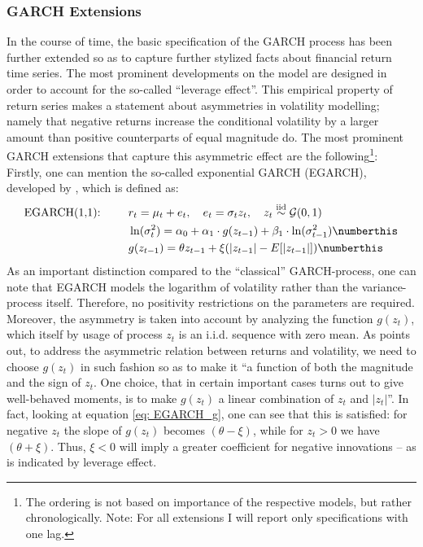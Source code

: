 \subsubsection{GARCH Extensions}
\label{sssec: lit_rev_vola_GARCH_ext}

In the course of time, the basic specification of the GARCH process has been further extended so as to capture further stylized facts about financial return time series. The most prominent developments on the model are designed in order to account for the so-called \enquote{leverage effect}. This empirical property of return series makes a statement about asymmetries in volatility modelling; namely that negative returns increase the conditional volatility by a larger amount than positive counterparts of equal magnitude do. The most prominent GARCH extensions that capture this asymmetric effect are the following\footnote{The ordering is not based on importance of the respective models, but rather chronologically. Note: For all extensions I will report only specifications with one lag.}: Firstly, one can mention the so-called exponential GARCH (EGARCH), developed by \textcite{Nelson1991}, which is defined as:
\begin{align*}
\text{EGARCH(1,1): }\qquad & r_t = \mu_{t} + e_{t}, \quad e_{t} = \sigma_{t} z_{t},\quad  z_{t} \overset{\text{iid}}{\sim} \mathcal{G}(0,1) \\
& \ln (\sigma_t^2) = \alpha_0 + \alpha_1 \cdot g(z_{t-1}) + \beta_1 \cdot \ln (\sigma_{t-1}^2) \numberthis \\
& g(z_{t-1}) = \theta z_{t-1} + \xi(|z_{t-1}| - E[|z_{t-1}|]) \numberthis \label{eq: EGARCH_g}
\end{align*} 
As an important distinction compared to the \enquote{classical} GARCH-process, one can note that EGARCH models the logarithm of volatility rather than the variance-process itself. Therefore, no positivity restrictions on the parameters are required. Moreover, the asymmetry is taken into account by analyzing the function $g(z_{t})$, which itself by usage of process $z_{t}$ is an i.i.d. sequence with zero mean. As  \textcite[351]{Nelson1991} points out, to address the asymmetric relation between returns and volatility, we need to choose $g(z_{t})$ in such fashion so as to make it \enquote{a function of both the magnitude and the sign of $z_{t}$. One choice, that in certain important cases turns out to give well-behaved moments, is to make $g(z_{t})$ a linear combination of $z_{t}$ and $|z_{t}|$}. In fact, looking at equation \eqref{eq: EGARCH_g}, one can see that this is satisfied: for negative $z_{t}$ the slope of $g(z_{t})$ becomes $(\theta-\xi)$, while for $z_{t}>0$ we have $(\theta+\xi)$. Thus, $\xi<0$ will imply a greater coefficient for negative innovations -- as is indicated by leverage effect.

